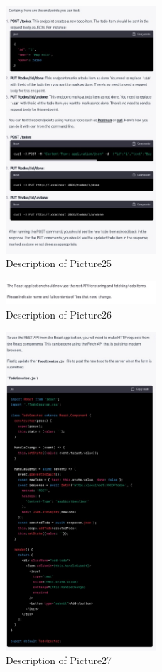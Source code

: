 \documentclass[runningheads]{llncs}
\begin{document}
\begin{figure}[h]
    \centering
    \includegraphics[width=0.5\textwidth]{Pictures/Picture25.jpg}
    \caption{Description of Picture25}
    \label{fig:picture25}
\end{figure}
\begin{figure}[h]
    \centering
    \includegraphics[width=0.5\textwidth]{Pictures/Picture26.jpg}
    \caption{Description of Picture26}
    \label{fig:picture26}
\end{figure}
\begin{figure}[h]
    \centering
    \includegraphics[width=0.5\textwidth]{Pictures/Picture27.jpg}
    \caption{Description of Picture27}
    \label{fig:picture27}
\end{figure}
\end{document}
